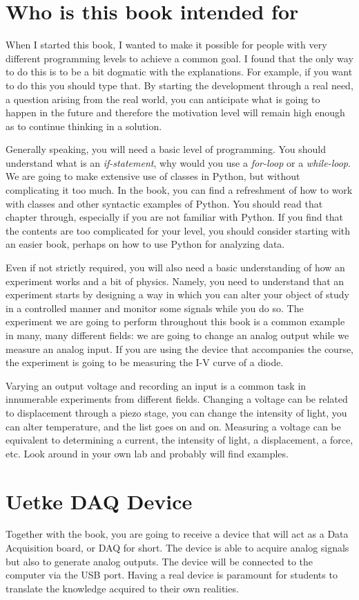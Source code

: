 \section{Who is this book intended for}
When I started this book, I wanted to make it possible for people with very different programming levels to achieve a common goal. I found that the only way to do this is to be a bit dogmatic with the explanations. For example, if you want to do this you should type that. By starting the development through a real need, a question arising from the real world, you can anticipate what is going to happen in the future and therefore the motivation level will remain high enough as to continue thinking in a solution.

Generally speaking, you will need a basic level of programming. You should understand what is an \textit{if-statement}, why would you use a \textit{for-loop} or a \textit{while-loop}. We are going to make extensive use of classes in Python, but without complicating it too much. In the book, you can find a refreshment of how to work with classes and other syntactic examples of Python. You should read that chapter through, especially if you are not familiar with Python. If you find that the contents are too complicated for your level, you should consider starting with an easier book, perhaps on how to use Python for analyzing data.

Even if not strictly required, you will also need a basic understanding of how an experiment works and a bit of physics. Namely, you need to understand that an experiment starts by designing a way in which you can alter your object of study in a controlled manner and monitor some signals while you do so. The experiment we are going to perform throughout this book is a common example in many, many different fields: we are going to change an analog output while we measure an analog input. If you are using the device that accompanies the course, the experiment is going to be measuring the I-V curve of a diode.

Varying an output voltage and recording an input is a common task in innumerable experiments from different fields. Changing a voltage can be related to displacement through a piezo stage, you can change the intensity of light, you can alter temperature, and the list goes on and on. Measuring a voltage can be equivalent to determining a current, the intensity of light, a displacement, a force, etc. Look around in your own lab and probably will find examples.

\section{Uetke DAQ Device}
Together with the book, you are going to receive a device that will act as a Data Acquisition board, or DAQ for short. The device is able to acquire analog signals but also to generate analog outputs. The device will be connected to the computer via the USB port. Having a real device is paramount for students to translate the knowledge acquired to their own realities. 

